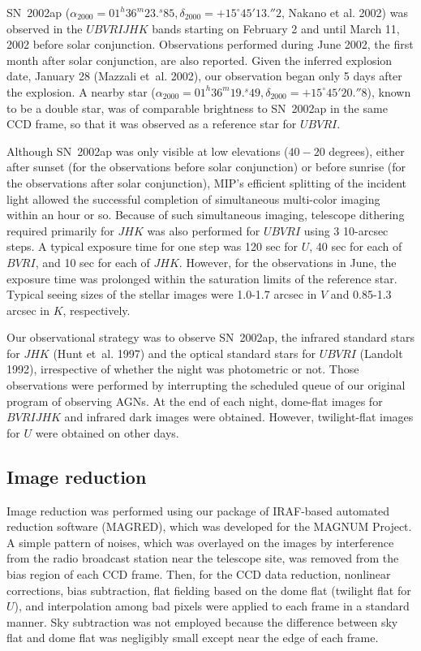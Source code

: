 \documentclass[10pt,preprint2]{aastex}
\begin{document}
SN~2002ap ($\alpha_{2000}= 01^h 36^m23.^s85,
\delta_{2000}=+15^{\circ}45'13.''2$, Nakano et al. 2002) was
observed in the $UBVRIJHK$ bands starting on February 2 and until
March 11, 2002 before solar conjunction. Observations performed
during June 2002, the first month after solar conjunction, are
also reported. Given the inferred explosion date, January 28
(Mazzali et~al. 2002), our observation began only 5 days after the
explosion. A nearby star ($\alpha_{2000}= 01^h 36^m19.^s49,
\delta_{2000}=+15^{\circ}45'20.''8$), known to be a double star,
was of comparable brightness to SN~2002ap in the same CCD frame,
so that it was observed as a reference star for $UBVRI$.

Although SN~2002ap was only visible at low elevations ($40-20$
degrees), either after sunset (for the observations before solar
conjunction) or before sunrise (for the observations after solar
conjunction), MIP's efficient splitting of the incident light
allowed the successful completion of simultaneous multi-color
imaging within an hour or so.  Because of such simultaneous
imaging, telescope dithering required primarily for $JHK$ was also
performed for $UBVRI$ using 3 10-arcsec steps. A typical exposure
time for one step was 120 sec for $U$, 40 sec for each of $BVRI$,
and 10 sec for each of $JHK$.  However, for the observations in
June, the exposure time was prolonged within the saturation limits
of the reference star. Typical seeing sizes of the stellar images
were 1.0-1.7 arcsec in $V$ and 0.85-1.3 arcsec in $K$,
respectively.

Our observational strategy was to observe SN~2002ap, the infrared
standard stars for $JHK$ (Hunt et~al. 1997) and the optical
standard stars for $UBVRI$ (Landolt 1992), irrespective of whether
the night was photometric or not. Those observations were performed
by interrupting the scheduled queue of our original program of
observing AGNs. At the end of each night, dome-flat images for
$BVRIJHK$ and infrared dark images were obtained.  However,
twilight-flat images for $U$ were obtained on other days.

\subsection{Image reduction}

Image reduction was performed using our package of IRAF-based
automated reduction software (MAGRED), which was developed
for the MAGNUM Project.  A simple pattern of noises, which was
overlayed on the images by interference from the radio broadcast
station near the telescope site, was removed from the bias
region of each CCD frame. Then, for the CCD data reduction,
nonlinear corrections, bias subtraction, flat fielding based
on the dome flat (twilight flat for $U$), and interpolation
among bad pixels were applied to each frame in a standard manner.
Sky subtraction was not employed because the difference between
sky flat and dome flat was negligibly small except near the edge
of each frame.
\end{document}
